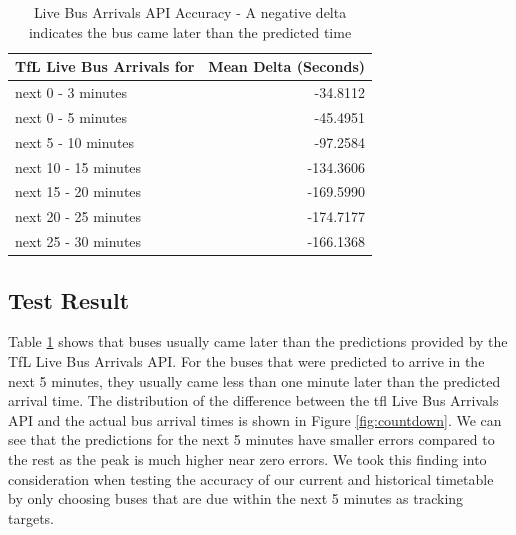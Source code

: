 \begin{table}
\centering
\begin{tabular}{@{}lr@{}} \toprule
TfL Live Bus Arrivals for & Mean Delta (Seconds) \\ \midrule
next 0 - 3 minutes & -34.8112 \\
next 0 - 5 minutes & -45.4951 \\
next 5 - 10 minutes & -97.2584 \\
next 10 - 15 minutes & -134.3606 \\
next 15 - 20 minutes & -169.5990 \\
next 20 - 25 minutes & -174.7177 \\
next 25 - 30 minutes & -166.1368 \\
\bottomrule
\end{tabular}
\caption{Live Bus Arrivals API Accuracy - A negative delta indicates the bus came later than the predicted time}
\label{table:countdown_evaluation}
\end{table}

\subsection{Test Result}
\par Table \ref{table:countdown_evaluation} shows that buses usually came later than the predictions provided by the TfL Live Bus Arrivals API. For the buses that were predicted to arrive in the next 5 minutes, they usually came less than one minute later than the predicted arrival time. The distribution of the difference between the \acrshort{tfl} Live Bus Arrivals API and the actual bus arrival times is shown in Figure \ref{fig:countdown}. We can see that the predictions for the next 5 minutes have smaller errors compared to the rest as the peak is much higher near zero errors. We took this finding into consideration when testing the accuracy of our current and historical timetable by only choosing buses that are due within the next 5 minutes as tracking targets.

